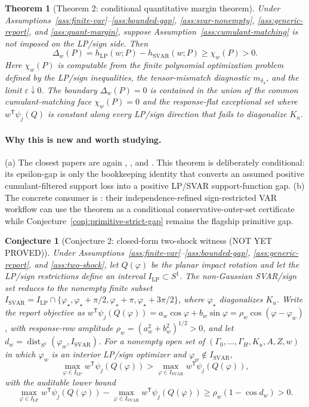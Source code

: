 \documentclass[11pt]{article}
\newcommand{\transpose}{\mathsf{T}}
\theoremstyle{definition}
\theoremstyle{plain}
\newtheorem{theorem}{Theorem}
\newtheorem{conjecture}{Conjecture}
\theoremstyle{remark}
\begin{document}
\begin{theorem}[Theorem 2: conditional quantitative margin theorem]\label{thm:conditional-margin}
Under Assumptions~\ref{ass:finite-var}--\ref{ass:bounded-gap}, \ref{ass:svar-nonempty}, \ref{ass:generic-report}, and \ref{ass:quant-margin}, suppose Assumption~\ref{ass:cumulant-matching} is not imposed on the LP/sign side.  Then
\[
\Delta_w(P)=h_{\mathrm{LP}}(w;P)-h_{\mathrm{SVAR}}(w;P)\ge \chi_w(P)>0.
\]
Here \(\chi_w(P)\) is computable from the finite polynomial optimization problem defined by the LP/sign inequalities, the tensor-mismatch diagnostic \(m_{\delta_4}\), and the limit \(\varepsilon\downarrow0\).  The boundary \(\Delta_w(P)=0\) is contained in the union of the common cumulant-matching face \(\chi_w(P)=0\) and the response-flat exceptional set where \(w^\transpose\psi_j(Q)\) is constant along every LP/sign direction that fails to diagonalize \(K_u\).
\end{theorem}
\paragraph{Why this is new and worth studying.}
(a) The closest papers are again \citet{PlagborgMollerWolf2021}, \citet{LanneMeitzSaikkonen2017}, and \citet{DrautzburgWright2023}.  This theorem is deliberately conditional: its epsilon-gap is only the bookkeeping identity that converts an assumed positive cumulant-filtered support loss into a positive LP/SVAR support-function gap.  (b) The concrete consumer is \citet{DrautzburgWright2023}: their independence-refined sign-restricted VAR workflow can use the theorem as a conditional conservative-outer-set certificate while Conjecture~\ref{conj:primitive-strict-gap} remains the flagship primitive gap.

\begin{conjecture}[Conjecture 2: closed-form two-shock witness (NOT YET PROVED)]\label{conj:two-shock-witness}
Under Assumptions~\ref{ass:finite-var}--\ref{ass:bounded-gap}, \ref{ass:generic-report}, and \ref{ass:two-shock}, let \(Q(\varphi)\) be the planar impact rotation and let the LP/sign restrictions define an interval \(I_{\mathrm{LP}}\subset S^1\).  The non-Gaussian SVAR/sign set reduces to the nonempty finite subset \(I_{\mathrm{SVAR}}=I_{\mathrm{LP}}\cap\{\varphi_\star,\varphi_\star+\pi/2,\varphi_\star+\pi,\varphi_\star+3\pi/2\}\), where \(\varphi_\star\) diagonalizes \(K_u\).  Write the report objective as \(w^\transpose\psi_j(Q(\varphi))=a_w\cos\varphi+b_w\sin\varphi=\rho_w\cos(\varphi-\varphi_w)\), with response-row amplitude \(\rho_w=(a_w^2+b_w^2)^{1/2}>0\), and let \(d_w=\operatorname{dist}_{S^1}(\varphi_w,I_{\mathrm{SVAR}})\).  For a nonempty open set of \((\Gamma_0,\ldots,\Gamma_H,K_u,A,Z,w)\) in which \(\varphi_w\) is an interior LP/sign optimizer and \(\varphi_w\notin I_{\mathrm{SVAR}}\),
\[
\max_{\varphi\in I_{\mathrm{LP}}}w^\transpose\psi_j(Q(\varphi))
>
\max_{\varphi\in I_{\mathrm{SVAR}}}w^\transpose\psi_j(Q(\varphi)),
\]
with the auditable lower bound
\[
\max_{\varphi\in I_{\mathrm{LP}}}w^\transpose\psi_j(Q(\varphi))
-
\max_{\varphi\in I_{\mathrm{SVAR}}}w^\transpose\psi_j(Q(\varphi))
\ge \rho_w(1-\cos d_w)>0.
\]
\end{conjecture}
\end{document}
